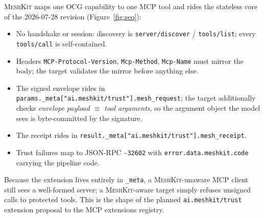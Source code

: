 \documentclass[10pt,twocolumn]{article}
\newcommand{\meshkit}{\textsc{MeshKit}}
\newcommand{\field}[1]{\texttt{#1}}
\begin{document}
\meshkit{} maps one OCG capability to one MCP tool and rides the stateless
core of the 2026-07-28 revision (Figure~\ref{fig:seq}):

\begin{itemize}[leftmargin=1.4em,itemsep=1pt]
  \item No handshake or session: discovery is \field{server/discover} /
        \field{tools/list}; every \field{tools/call} is self-contained.
  \item Headers \field{MCP-Protocol-Version}, \field{Mcp-Method},
        \field{Mcp-Name} must mirror the body; the target validates the
        mirror before anything else.
  \item The signed envelope rides in
        \field{params.\_meta["ai.meshkit/trust"].mesh\_request}; the
        target additionally checks
        \emph{envelope payload $\equiv$ tool arguments}, so the argument
        object the model sees is byte-committed by the signature.
  \item The receipt rides in
        \field{result.\_meta["ai.meshkit/trust"].mesh\_receipt}.
  \item Trust failures map to JSON-RPC \field{-32602} with
        \field{error.data.meshkit.code} carrying the pipeline code.
\end{itemize}

Because the extension lives entirely in \field{\_meta}, a
\meshkit-unaware MCP client still sees a well-formed server; a
\meshkit-aware target simply refuses unsigned calls to protected tools.
This is the shape of the planned \field{ai.meshkit/trust} extension
proposal to the MCP extensions registry.
\end{document}

